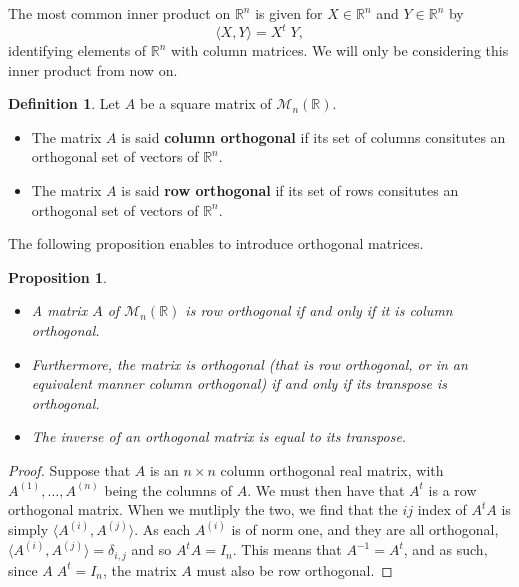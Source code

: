 \documentclass{report}
\newtheorem{prop}{Proposition}
\theoremstyle{definition}
\newtheorem{defin}{Definition}
\theoremstyle{remark}
\begin{document}
\vspace{0,8cm}
The most common inner product on $\mathbb{R}^n$ is given for $X \in \mathbb{R}^n$ and $Y \in \mathbb{R}^n$ by 
\begin{equation*}
         \langle X, Y \rangle = X^t\;Y,
\end{equation*}
identifying elements of $\mathbb{R}^n$ with column matrices. We will only be considering this inner product from now on.
\vspace{0,8cm}

\begin{defin} Let $A$ be a square matrix of $\mathcal{M}_{n}(\mathbb{R})$. 
\begin{itemize}
    \item The matrix $A$ is said \textbf{column orthogonal} if its set of columns consitutes an orthogonal set of vectors of $\mathbb{R}^n$.
\item The matrix $A$ is said \textbf{row orthogonal} if its set of rows consitutes an orthogonal set of vectors of $\mathbb{R}^n$.
        \end{itemize}
\end{defin}

\bigskip
The following proposition enables to introduce orthogonal matrices.

\begin{prop}\label{prop ortho} 
\begin{itemize}
    \item  A matrix $A$ of $\mathcal{M}_{n}(\mathbb{R})$ is row orthogonal if and only if it is column orthogonal.
    \item Furthermore, the matrix is orthogonal (that is row orthogonal, or in an equivalent manner column orthogonal) if and only if its transpose is orthogonal.
    \item The inverse of an orthogonal matrix is equal to its transpose.
\end{itemize}
\end{prop}

\begin{proof}
        Suppose that $A$ is an $n \times n$  column orthogonal real matrix, with $A^{(1)}, \dots ,A^{(n)}$ being the columns of $A$. We must then have that $A^t$ is a row orthogonal matrix. When we mutliply the two, we find that the $ij$ index of $A^t A$ is simply $\langle A^{(i)}, A^{(j)}\rangle$. As each $A^{(i)}$ is of norm one, and they are all orthogonal, $\langle A^{(i)}, A^{(j)} \rangle = \delta_{i,j}$ and so $A^t A = I_n$. This means that $A^{-1} = A^t$, and as such, since $A\;A^t = I_n$, the matrix $A$ must also be row orthogonal.
\end{proof}
\end{document}
